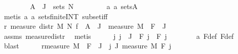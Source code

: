 \begin{isabellebody}
\ \ \ \ \isamarkupfalse%
\ \isamarkupfalse%
\ {\isachardoublequoteopen}{\isasymInter}\ {\isacharparenleft}{\kern0pt}A{\isacharprime}{\kern0pt}\ {\isacharbackquote}{\kern0pt}\ J{\isacharparenright}{\kern0pt}\ {\isasymin}\ sets\ N{\isachardoublequoteclose}\ \isanewline
\ \ \ \ \ \ \isamarkupfalse%
\ a{}\ a{}\ sets{\isacharunderscore}{\kern0pt}A\ \isanewline
\ \ \ \ \ \ \isamarkupfalse%
\ {\isacharparenleft}{\kern0pt}metis\ a{}\ a{}\ sets{\isachardot}{\kern0pt}finite{\isacharunderscore}{\kern0pt}INT\ subset{\isacharunderscore}{\kern0pt}iff{\isacharparenright}{\kern0pt}\isanewline
\ \ \ \ \isamarkupfalse%
\ \isamarkupfalse%
\ r{}{\isacharcolon}{\kern0pt}\ {\isachardoublequoteopen}measure\ {\isacharparenleft}{\kern0pt}distr\ M\ N\ f{\isacharparenright}{\kern0pt}\ {\isacharparenleft}{\kern0pt}{\isasymInter}\ {\isacharparenleft}{\kern0pt}A{\isacharprime}{\kern0pt}\ {\isacharbackquote}{\kern0pt}\ J{\isacharparenright}{\kern0pt}{\isacharparenright}{\kern0pt}\ {\isacharequal}{\kern0pt}\ measure\ M\ {\isacharparenleft}{\kern0pt}{\isasymInter}\ {\isacharparenleft}{\kern0pt}F{\isacharprime}{\kern0pt}\ {\isacharbackquote}{\kern0pt}\ J{\isacharparenright}{\kern0pt}{\isacharparenright}{\kern0pt}{\isachardoublequoteclose}\ \isanewline
\ \ \ \ \ \ \isamarkupfalse%
\ assms{\isacharparenleft}{\kern0pt}{}{\isacharparenright}{\kern0pt}\ measure{\isacharunderscore}{\kern0pt}distr\ \isamarkupfalse%
\ metis\isanewline
\isanewline
\ \ \ \ \isamarkupfalse%
\ {\isachardoublequoteopen}{\isasymAnd}j{\isachardot}{\kern0pt}\ j\ {\isasymin}\ J\ {\isasymLongrightarrow}\ F{\isacharprime}{\kern0pt}\ j\ {\isasymin}\ F\ j{\isachardoublequoteclose}\isanewline
\ \ \ \ \ \ \isamarkupfalse%
\ a{}\ F{\isacharprime}{\kern0pt}{\isacharunderscore}{\kern0pt}def\ F{\isacharunderscore}{\kern0pt}def\ \isamarkupfalse%
\ blast\isanewline
\ \ \ \ \isamarkupfalse%
\ r{}{\isacharcolon}{\kern0pt}{\isachardoublequoteopen}measure\ M\ {\isacharparenleft}{\kern0pt}{\isasymInter}\ {\isacharparenleft}{\kern0pt}F{\isacharprime}{\kern0pt}\ {\isacharbackquote}{\kern0pt}\ J{\isacharparenright}{\kern0pt}{\isacharparenright}{\kern0pt}\ {\isacharequal}{\kern0pt}\ {\isacharparenleft}{\kern0pt}{\isasymProd}j{\isasymin}\ J{\isachardot}{\kern0pt}\ measure\ M\ {\isacharparenleft}{\kern0pt}F{\isacharprime}{\kern0pt}\ j{\isacharparenright}{\kern0pt}{\isacharparenright}{\kern0pt}{\isachardoublequoteclose}\isanewline

\end{isabellebody}
